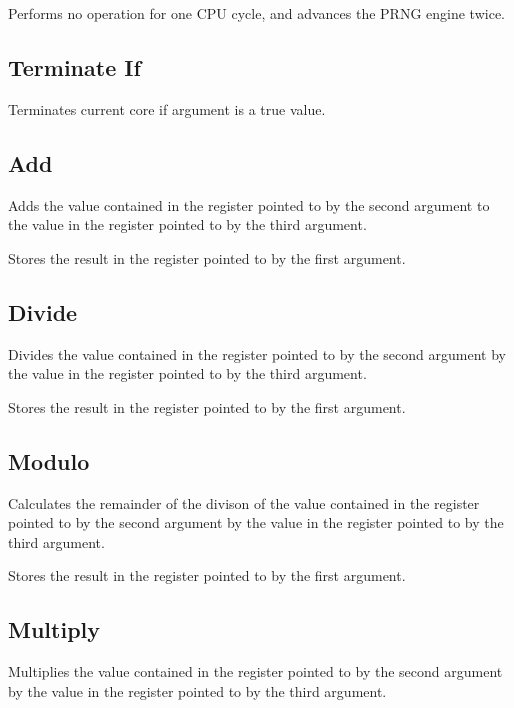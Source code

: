 
Performs no operation for one CPU cycle, and advances the PRNG engine twice.

\subsection{Terminate If}


Terminates current core if argument is a true value.

\subsection{Add}


Adds the value contained in the register pointed to by the second argument to the value in the register pointed to by the third argument.

Stores the result in the register pointed to by the first argument.

\subsection{Divide}


Divides the value contained in the register pointed to by the second argument by the value in the register pointed to by the third argument.

Stores the result in the register pointed to by the first argument.

\subsection{Modulo}


Calculates the remainder of the divison of the value contained in the register pointed to by the second argument by the value in the register pointed to by the third argument.

Stores the result in the register pointed to by the first argument.

\subsection{Multiply}


Multiplies the value contained in the register pointed to by the second argument by the value in the register pointed to by the third argument.


